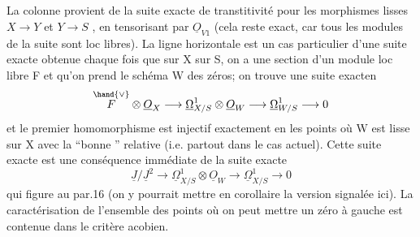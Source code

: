 
La colonne provient de la suite exacte de transtitivité pour les
morphismes lisses $X\to Y$ et $Y\to S$ , en  tensorisant par $\underline{O}_{V1}$ (cela reste
exact, car tous les modules de la suite sont loc libres). La ligne
horizontale est un cas particulier d'une suite exacte obtenue chaque
fois que sur X  sur S, on a une section \unsure{$\phi$} d'un module loc libre F
et qu'on prend le schéma W des zéros; on trouve une suite exacten
\[ \overset{\hand{\vee}}{F}\otimes \underline{O}_X \longrightarrow \underline{\Omega}^1_{X/S}\otimes \underline{O}_W \longrightarrow \underline{\Omega}^1_{W/S} \longrightarrow 0 \]
et  le premier homomorphisme est injectif exactement en les points où
W est lisse sur X avec la ``bonne ''  relative (i.e. partout dans
le cas actuel).  Cette suite exacte est 
  une
conséquence immédiate de la suite exacte
\[ \underline{J}/\underline{J}^2\longrightarrow \underline{\Omega}^1_{X/S}\otimes \underline{O}_W \longrightarrow \underline{\Omega}^1_{X/S} \longrightarrow 0 \]
 qui figure au par.16 (on y pourrait mettre en corollaire la version
signalée ici). La caractérisation de l'ensemble des points où on
peut mettre un zéro à gauche est contenue dans le critère acobien.

